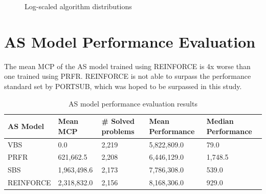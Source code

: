 \begin{figure}[H]
	\centering
	\caption{Log-scaled algorithm distributions}
	\label{fig:logalgodist}
\end{figure}

\section{AS Model Performance Evaluation}

The mean MCP of the AS model trained using REINFORCE is 4x worse than one trained using PRFR. REINFORCE is not able to surpass the performance standard set by PORTSUB, which was hoped to be surpassed in this study.

\begin{table}[H]
	\begin{tabular}{|l|l|l|l|l|}
		\hline
		\textbf{AS Model} & \textbf{Mean MCP} & \textbf{\# Solved problems} & \textbf{Mean Performance} & \textbf{Median Performance} \\ \hline
		VBS               & 0.0               & 2,219                       & 5,822,809.0               & 79.0                        \\ \hline
		PRFR              & 621,662.5         & 2,208                       & 6,446,129.0               & 1,748.5                     \\ \hline
		SBS               & 1,963,498.6       & 2,173                       & 7,786,308.0               & 539.0                       \\ \hline
		REINFORCE         & 2,318,832.0       & 2,156                       & 8,168,306.0               & 929.0                       \\ \hline
	\end{tabular}
	\caption{AS model performance evaluation results}
	\label{tbl:asresults}
\end{table}

